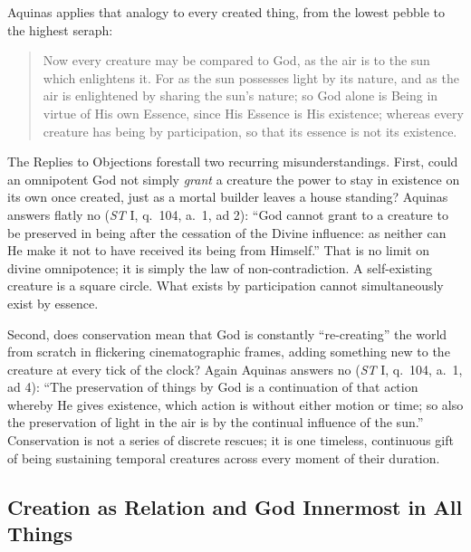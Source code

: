 Aquinas applies that analogy to every created thing, from the lowest pebble to the highest seraph:

\begin{quote}
Now every creature may be compared to God, as the air is to the sun which enlightens it. For as the sun possesses light by its nature, and as the air is enlightened by sharing the sun's nature; so God alone is Being in virtue of His own Essence, since His Essence is His existence; whereas every creature has being by participation, so that its essence is not its existence.
\end{quote}

The Replies to Objections forestall two recurring misunderstandings. First, could an omnipotent God not simply \emph{grant} a creature the power to stay in existence on its own once created, just as a mortal builder leaves a house standing? Aquinas answers flatly no (\emph{ST} I, q.\ 104, a.\ 1, ad 2): ``God cannot grant to a creature to be preserved in being after the cessation of the Divine influence: as neither can He make it not to have received its being from Himself.'' That is no limit on divine omnipotence; it is simply the law of non-contradiction. A self-existing creature is a square circle. What exists by participation cannot simultaneously exist by essence.

Second, does conservation mean that God is constantly ``re-creating'' the world from scratch in flickering cinematographic frames, adding something new to the creature at every tick of the clock? Again Aquinas answers no (\emph{ST} I, q.\ 104, a.\ 1, ad 4): ``The preservation of things by God is a continuation of that action whereby He gives existence, which action is without either motion or time; so also the preservation of light in the air is by the continual influence of the sun.'' Conservation is not a series of discrete rescues; it is one timeless, continuous gift of being sustaining temporal creatures across every moment of their duration.

\subsection{Creation as Relation and God Innermost in All Things}

